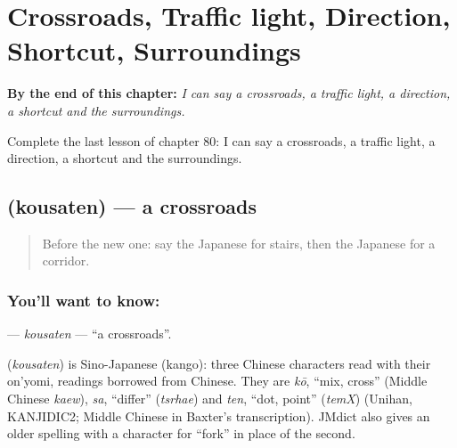 
\chapter{Crossroads, Traffic light, Direction, Shortcut, Surroundings}
\label{ch:ja-crossroads-traffic-light-direction-shortcut-surroundings}

\begin{chapteropening}
\textbf{By the end of this chapter:} \emph{I can say a crossroads, a traffic light, a direction, a shortcut and the surroundings.}

Complete the last lesson of chapter 80: I can say a crossroads, a traffic light, a direction, a shortcut and the surroundings.
\end{chapteropening}

\section[\texorpdfstring{\ja{こうさてん} (kousaten)}{こうさてん (kousaten)}]{ (kousaten) — a crossroads}

\label{lesson:JA-C80-kousaten}



\begin{quote}
Before the new one: say the Japanese for stairs, then the Japanese for a corridor.
\end{quote}

\subsection*{You'll want to know: }
\textbf{} — \emph{kousaten} — \textquotedblleft{}a crossroads\textquotedblright{}.

\begin{cousinweb}
\textbf{} (\emph{kousaten}) is Sino-Japanese (kango): three Chinese characters read with their on'yomi, readings borrowed from Chinese. They are \emph{kō}, \textquotedblleft{}mix, cross\textquotedblright{} (Middle Chinese \emph{kaew}), \emph{sa}, \textquotedblleft{}differ\textquotedblright{} (\emph{tsrhae}) and \emph{ten}, \textquotedblleft{}dot, point\textquotedblright{} (\emph{temX}) (Unihan, KANJIDIC2; Middle Chinese in Baxter's transcription). JMdict also gives an older spelling with a character for \textquotedblleft{}fork\textquotedblright{} in place of the second.
\end{cousinweb}

